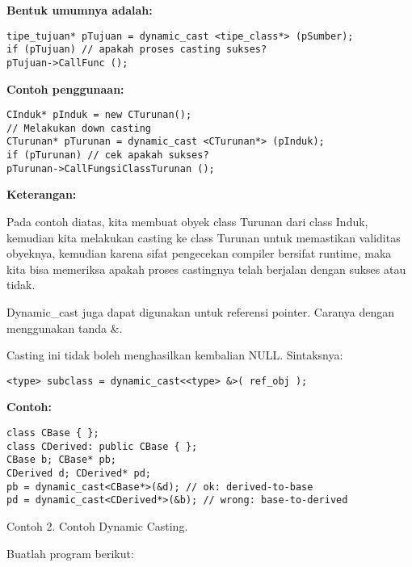 \textbf{Bentuk umumnya adalah:}

\begin{verbatim}
tipe_tujuan* pTujuan = dynamic_cast <tipe_class*> (pSumber);
if (pTujuan) // apakah proses casting sukses?
pTujuan->CallFunc ();
\end{verbatim}

\textbf{Contoh penggunaan:}

\begin{verbatim}
CInduk* pInduk = new CTurunan();
// Melakukan down casting
CTurunan* pTurunan = dynamic_cast <CTurunan*> (pInduk);
if (pTurunan) // cek apakah sukses?
pTurunan->CallFungsiClassTurunan ();
\end{verbatim}

\textbf{Keterangan:}

Pada contoh diatas, kita membuat obyek class Turunan dari class Induk,
kemudian kita melakukan casting ke class Turunan untuk memastikan
validitas obyeknya, kemudian karena sifat pengecekan compiler bersifat
runtime, maka kita bisa memeriksa apakah proses castingnya telah
berjalan dengan sukses atau tidak.

Dynamic\_cast juga dapat digunakan untuk referensi pointer. Caranya
dengan menggunakan tanda \&.

Casting ini tidak boleh menghasilkan kembalian NULL. Sintaksnya:

\begin{verbatim}
<type> subclass = dynamic_cast<<type> &>( ref_obj );
\end{verbatim}

\textbf{Contoh:}

\begin{verbatim}
class CBase { };
class CDerived: public CBase { };
CBase b; CBase* pb;
CDerived d; CDerived* pd;
pb = dynamic_cast<CBase*>(&d); // ok: derived-to-base
pd = dynamic_cast<CDerived*>(&b); // wrong: base-to-derived
\end{verbatim}

Contoh 2. Contoh Dynamic Casting.

Buatlah program berikut:

